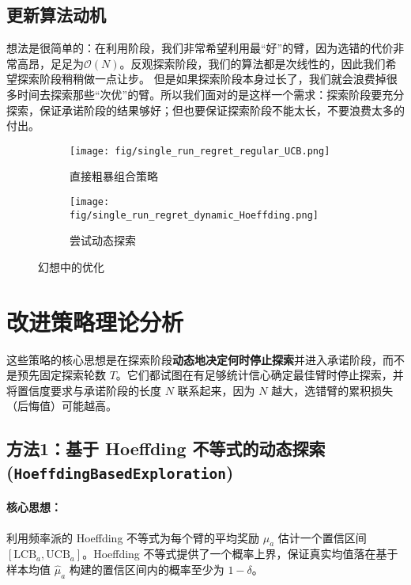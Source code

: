 \documentclass[6pt, a4paper]{ctexart} %
\begin{document}
\subsection{更新算法动机}
想法是很简单的：在利用阶段，我们非常希望利用最“好”的臂，因为选错的代价非常高昂，足足为$\mathcal{O}(N)$。反观探索阶段，我们的算法都是次线性的，因此我们希望探索阶段稍稍做一点让步。
但是如果探索阶段本身过长了，我们就会浪费掉很多时间去探索那些“次优”的臂。所以我们面对的是这样一个需求：探索阶段要充分探索，保证承诺阶段的结果够好；但也要保证探索阶段不能太长，不要浪费太多的付出。

\begin{figure}[htbp]
    \centering
    \begin{subfigure}[b]{0.48\textwidth}
        \texttt{[image: fig/single\_run\_regret\_regular\_UCB.png]}
        \caption{直接粗暴组合策略}
        \label{fig:image3}
    \end{subfigure}
    \hfill
    \begin{subfigure}[b]{0.48\textwidth}
        \texttt{[image: fig/single\_run\_regret\_dynamic\_Hoeffding.png]}
        \caption{尝试动态探索}
        \label{fig:image4}
    \end{subfigure}
    \caption{幻想中的优化}
    \label{fig:both_images}
\end{figure}

\section{改进策略理论分析}

这些策略的核心思想是在探索阶段\textbf{动态地决定何时停止探索}并进入承诺阶段，而不是预先固定探索轮数 $T$。它们都试图在有足够统计信心确定最佳臂时停止探索，并将置信度要求与承诺阶段的长度 $N$ 联系起来，因为 $N$ 越大，选错臂的累积损失（后悔值）可能越高。

\subsection{方法1：基于 Hoeffding 不等式的动态探索 (\texttt{HoeffdingBasedExploration})}

\paragraph{核心思想：} 利用频率派的 Hoeffding 不等式为每个臂的平均奖励 $\mu_a$ 估计一个置信区间 $[\text{LCB}_a, \text{UCB}_a]$。Hoeffding 不等式提供了一个概率上界，保证真实均值落在基于样本均值 $\hat{\mu}_a$ 构建的置信区间内的概率至少为 $1-\delta$。
\end{document}
